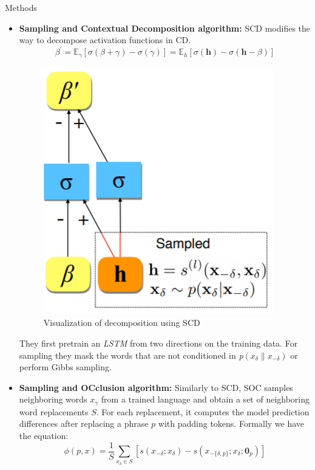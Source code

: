 \documentclass[final]{beamer}
\newlength{\onecolwid}
\newlength{\twocolwid}
\begin{document}
\begin{frame}[t]
\begin{columns}[t]
\begin{column}{\twocolwid}
\begin{columns}[t,totalwidth=\twocolwid]
\begin{column}{\onecolwid}
\begin{block}{Methods}
\begin{itemize}
    \item \textbf{Sampling and Contextual Decomposition algorithm:}
    SCD modifies the way to decompose activation functions in CD.
    \begin{equation}
     \beta^{\prime} = \mathbb{E}_{\gamma}[\sigma ( \beta + \gamma )- \sigma(\gamma)] = \mathbb{E}_{h}[\sigma(\textbf{h}) -\sigma(\textbf{h} - \beta)]
    \end{equation}
     \begin{figure}
        \includegraphics[width=0.35\linewidth]{images/SCD.png}
        \caption{Visualization of decomposition using SCD}
    \end{figure}
    They first pretrain an \textit{LSTM} from two directions on the training data. For sampling they mask the words that are not conditioned in \textit{p}$(x_\delta\|x_{-\delta})$ or perform Gibbs sampling.
    
    
    \item \textbf{Sampling and OCclusion algorithm:}
    Similarly to SCD, SOC samples neighboring words $x_\gamma$ from a trained language and obtain a set of neighboring word replacements $S$. For each replacement, it computes the model prediction differences after replacing a phrase $p$ with padding tokens. Formally we have the equation: \newline
     \begin{equation}
     \phi(p, x) = \frac{1}{S} \sum_{x_\delta \in S} [ s(x_{-\delta};x_\delta)
    - s(x_{-\{\delta,p\}}; x_\delta; \textbf{0}_p)]
     \end{equation}
\end{itemize}
\end{block}

\end{column} %
\end{columns} %


\end{column}
\end{columns}
\end{frame}
\end{document}
